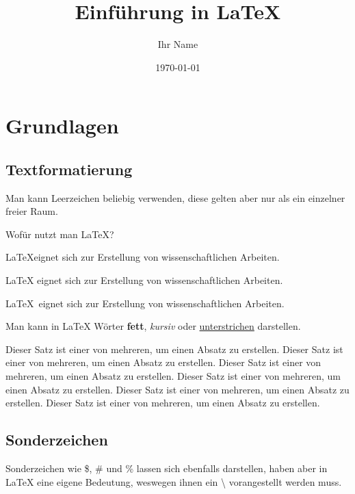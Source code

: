 \documentclass{article}
\author{Ihr Name}
\date{\today}
\title{Einführung in \LaTeX}
\begin{document}
\maketitle

\section{Grundlagen}

\subsection{Textformatierung}

Man kann Leerzeichen     beliebig     verwenden, diese gelten aber nur als ein einzelner freier Raum.

\vspace{1em}

\noindent Wofür nutzt man \LaTeX?

\noindent\LaTeX     eignet sich zur Erstellung von wissenschaftlichen Arbeiten.

\noindent\LaTeX{} eignet sich zur Erstellung von wissenschaftlichen Arbeiten.

\noindent\LaTeX\ eignet sich zur Erstellung von wissenschaftlichen Arbeiten.

\vspace{1em}

\noindent Man kann in \LaTeX{} Wörter \textbf{fett}, \textit{kursiv} oder \underline{unterstrichen} darstellen.

\vspace{1em}

Dieser Satz ist einer von mehreren, um einen Absatz zu erstellen. Dieser Satz ist einer von mehreren, um einen Absatz zu erstellen. Dieser Satz ist einer von mehreren, um einen Absatz zu erstellen.
Dieser Satz ist einer von mehreren, um einen Absatz zu erstellen. Dieser Satz ist einer von mehreren, um einen Absatz zu erstellen. Dieser Satz ist einer von mehreren, um einen Absatz zu erstellen.

\subsection{Sonderzeichen}

Sonderzeichen wie \$, \# und \% lassen sich ebenfalls darstellen, haben aber in \LaTeX{} eine eigene Bedeutung, weswegen ihnen ein \textbackslash{} vorangestellt werden muss.
\end{document}
